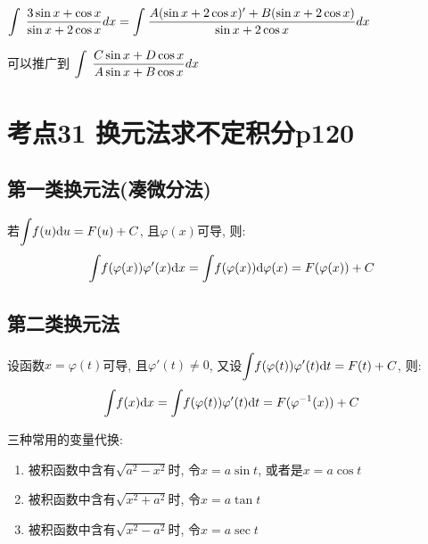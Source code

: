\begin{tcolorbox}


$\displaystyle\int_{}^{}\hspace{.2em}\frac{3\sin x+\cos x}{\sin x+2\cos x}dx=\int_{}^{}\frac{A(\sin x+2\cos x)'+B(\sin x+2\cos x)}{\sin x+2\cos x}dx$

可以推广到 $\displaystyle\int_{}^{}\hspace{.2em}\frac{C\sin x+D\cos x}{A\sin x+B\cos x}dx$

\end{tcolorbox}

\section{考点31 换元法求不定积分p120}

\subsection{第一类换元法(凑微分法)}
若$ \displaystyle\int_{}\hspace{.2em}f(u)\mathrm{d}u=F(u)+C $, 且$ \varphi(x) $可导, 则:
\begin{equation*}
\displaystyle\int_{}\hspace{.2em}f(\varphi(x))\varphi'(x)\mathrm{d}x=\displaystyle\int_{}\hspace{.2em}f(\varphi(x))\mathrm{d}\varphi(x)=F(\varphi(x))+C
\end{equation*}
\subsection{第二类换元法}
设函数$ x=\varphi(t) $可导, 且$ \varphi'(t)\neq 0 $, 又设$ \displaystyle\int_{}\hspace{.2em}f(\varphi(t))\varphi'(t)\mathrm{d}t=F(t)+C $, 则:
\begin{equation*}
\displaystyle\int_{}\hspace{.2em}f(x)\mathrm{d}x=\displaystyle\int_{}\hspace{.2em}f(\varphi(t))\varphi'(t)\mathrm{d}t=F(\varphi^{-1}(x))+C
\end{equation*}
\begin{tcolorbox}
三种常用的变量代换:
\begin{enumerate}
\item 被积函数中含有$ \sqrt{a^{2}-x^{2}} $时, 令$ x=a\sin t $, 或者是$ x=a\cos t $
\item 被积函数中含有$ \sqrt{x^{2}+a^{2}} $时, 令$ x=a\tan t $
\item 被积函数中含有$ \sqrt{x^{2}-a^{2}} $时, 令$ x=a\sec t $
\end{enumerate}
\end{tcolorbox}

